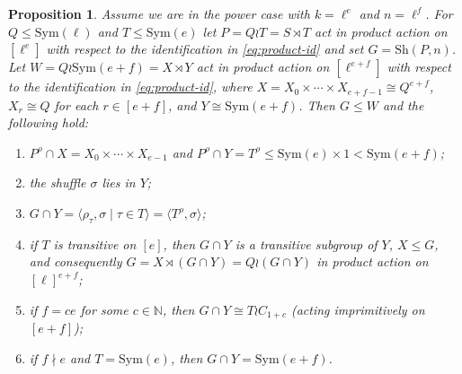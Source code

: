 \documentclass[12pt]{amsart}
\newtheorem{prop}[thm]{Proposition}
\theoremstyle{remark}
\theoremstyle{definition}
\newcommand{\sym}{\mathrm{Sym}}
\newcommand{\sh}{\mathrm{Sh}}
\begin{document}
\begin{prop} \label{prop:pa}
Assume we are in the power case with $k=\ell^e$ and $n=\ell^f$. For $Q \leqslant \sym(\ell)$ and $T \leqslant \sym(e)$ let $P = Q \wr T=S\rtimes T$ act in product action on $[\ell^e]$ with respect to the identification in \eqref{eq:product-id} and set $G = \sh(P,n)$.
Let $W = Q \wr \sym(e+f) = X \rtimes Y$ act in product action on $[\ell^{e+f}]$ with respect to the identification in \eqref{eq:product-id}, where $X = X_0 \times \cdots \times X_{e+f-1} \cong Q^{e+f}$, $X_r \cong Q$ for each $r \in [e+f]$, and $Y \cong \sym(e+f)$. Then $G \leqslant W$ and the following hold:
	\begin{enumerate}
	\item \label{rho_tau} $P^\rho \cap X  = X_0 \times \cdots \times X_{e-1}$ and $P^\rho \cap Y = T^\rho\leqslant \sym(e)\times 1 < \sym(e+f)$;
	\item \label{sigma-Y} the shuffle $\sigma$ lies in $Y$;
	\item \label{G cap Y} $G \cap Y = \langle \rho_\tau, \sigma \mid \tau \in T \rangle = \langle T^\rho, \sigma \rangle$;
	\item \label{X sub G} if $T$ is transitive on $[e]$, then $G \cap Y$ is a transitive subgroup of $Y$, $X \leqslant G$, and consequently $G = X \rtimes (G \cap Y) = Q \wr (G \cap Y)$ in product action on $[\ell]^{e+f}$;
	\item \label{e div f} if $f=ce$ for some $c \in \mathbb N$, then $G \cap Y \cong T \wr C_{1+c}$ (acting imprimitively on $[e+f]$);
	\item \label{e ndiv f} if $f \nmid e$ and $T = \sym(e)$, then $G \cap Y = \sym(e+f)$.
	\end{enumerate}
\end{prop}
\end{document}
